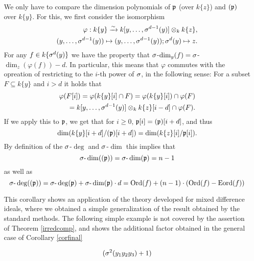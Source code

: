 \begin{cor}
\begin{bew}
We only have to compare the dimension polynomials of $\mathfrak{p}$ (over $k\{z\}$) and $(\mathfrak{p})$ over $k\{y\}$.
For this, we first consider the isomorphism
\begin{align*} \varphi: k\{y\} \xrightarrow{\sim} k[y,\ldots,\sigma^{d-1}(y)] \otimes_k k\{z\}, \\ (y,\ldots,\sigma^{d-1}(y)) \mapsto (y,\ldots,\sigma^{d-1}(y)); \sigma^d(y) \mapsto z. \end{align*}
For any $f \in k\{\sigma^{d}(y)\}$ we have the property that $\sigma$-$\operatorname{dim}_y(f) = \sigma$-$\operatorname{dim}_z(\varphi(f)) - d$.
In particular, this means that $\varphi$ commutes with the opreation of restricting to the $i$-th power of $\sigma$, in the following sense:
For a subset $F \subseteq k\{y\}$ and $i > d$ it holds that
\begin{align*} \varphi(F[i]) = \varphi(k\{y\}[i] \cap F) = \varphi(k\{y\}[i]) \cap \varphi(F) \\ = k[y,\ldots,\sigma^{d-1}(y)] \otimes_k k\{z\}[i-d] \cap \varphi(F) .\end{align*}
If we apply this to $\mathfrak{p}$, we get that for $i\geq 0$, $\mathfrak{p}[i] = (\mathfrak{p})[i+d]$, and thus $$\operatorname{dim}(k\{y\}[i+d]/(\mathfrak{p})[i+d]) = \operatorname{dim}(k\{z\}[i]/\mathfrak{p}[i]).$$
By definition of the $\sigma$-$\operatorname{deg}$ and $\sigma$-$\operatorname{dim}$ this implies that
$$\sigma\text{-}\operatorname{dim}((\mathfrak{p}))= \sigma\text{-}\operatorname{dim}(\mathfrak{p}) = n-1 $$
as well as
$$\sigma\text{-}\operatorname{deg}((\mathfrak{p}))= \sigma\text{-}\operatorname{deg}(\mathfrak{p}) + \sigma\text{-}\operatorname{dim}(\mathfrak{p}) \cdot d = \operatorname{Ord}(f) + (n-1) \cdot (\operatorname{Ord}(f) - \operatorname{Eord}(f))$$

\end{bew}
\end{cor}

This corollary shows an application of the theory developed for mixed difference ideals, where we obtained a simple generalization of the result obtained by the standard methods. 
The following simple example is not covered by the assertion of Theorem \ref{irredcomp}, and shows the additional factor obtained in the general case of Corollary \ref{corfinal}


\begin{ex}
$$(\sigma^2(y_1 y_2 y_3) + 1)$$
\end{ex}


